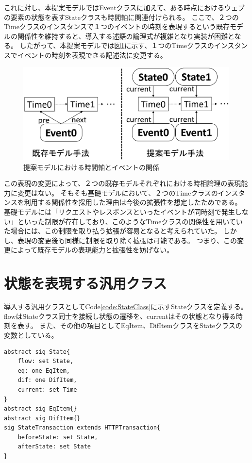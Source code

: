 \documentclass[12pt,a4paper]{jbook}
\begin{document}
これに対し、本提案モデルではEventクラスに加えて、ある時点におけるウェブの要素の状態を表すStateクラスも時間軸に関連付けられる。
ここで、２つのTimeクラスのインスタンスで１つのイベントの時刻を表現するという既存モデルの関係性を維持すると、導入する述語の論理式が複雑となり実装が困難となる。
したがって、本提案モデルでは図\ref{fig:ProposedModel-TimeClass}に示す、１つのTimeクラスのインスタンスでイベントの時刻を表現できる記述法に変更する。

\begin{figure}[htb]
\centering
\includegraphics[width=450pt]{./fig/ProposedModel-TimeClass.eps}
\caption{提案モデルにおける時間軸とイベントの関係}
\label{fig:ProposedModel-TimeClass}
\end{figure}

この表現の変更によって、２つの既存モデルそれぞれにおける時相論理の表現能力に変更はない。
そもそも基礎モデルにおいて、２つのTimeクラスのインスタンスを利用する関係性を採用した理由は今後の拡張性を想定したためである。
基礎モデルには「リクエストやレスポンスといったイベントが同時刻で発生しない」といった制限が存在しており、このようなTimeクラスの関係性を用いていた場合には、この制限を取り払う拡張が容易となると考えられていた。
しかし、表現の変更後も同様に制限を取り除く拡張は可能である。
つまり、この変更によって既存モデルの表現能力と拡張性を妨げない。

\section{状態を表現する汎用クラス}
導入する汎用クラスとしてCode\ref{code:StateClass}に示すStateクラスを定義する。
flowはStateクラス同士を接続し状態の遷移を、currentはその状態となり得る時刻を表す。
また、その他の項目としてEqItem、DifItemクラスをStateクラスの変数としている。
\begin{lstlisting}[caption=Stateクラス, label=code:StateClass]
abstract sig State{
	flow: set State,
	eq: one EqItem,
	dif: one DifItem,
	current: set Time
}
abstract sig EqItem{}
abstract sig DifItem{}
sig StateTransaction extends HTTPTransaction{
	beforeState: set State,
	afterState: set State
}
\end{lstlisting}
\end{document}
